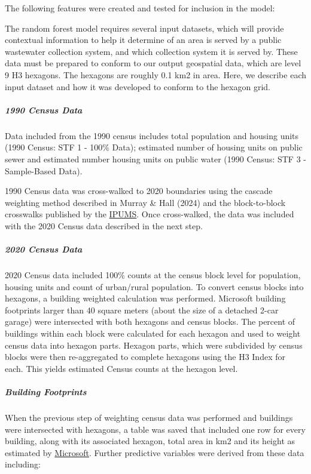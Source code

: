 \documentclass[
  letterpaper,
  DIV=11,
  numbers=noendperiod]{scrartcl}
\let\oldsubparagraph\subparagraph
\renewcommand{\subparagraph}[1]{\oldsubparagraph{#1}\mbox{}}
\begin{document}
The following features were created and tested for inclusion in the
model:

The random forest model requires several input datasets, which will
provide contextual information to help it determine of an area is served
by a public wastewater collection system, and which collection system it
is served by. These data must be prepared to conform to our output
geospatial data, which are level 9 H3 hexagons. The hexagons are roughly
0.1 km2 in area. Here, we describe each input dataset and how it was
developed to conform to the hexagon grid.

\subparagraph{1990 Census Data}\label{census-data}

Data included from the 1990 census includes total population and housing
units (1990 Census: STF 1 - 100\% Data); estimated number of housing
units on public sewer and estimated number housing units on public water
(1990 Census: STF 3 - Sample-Based Data).

1990 Census data was cross-walked to 2020 boundaries using the cascade
weighting method described in Murray \& Hall (2024) and the
block-to-block crosswalks published by the
\href{https://www.nhgis.org/geographic-crosswalks\#from-blocks}{IPUMS}.
Once cross-walked, the data was included with the 2020 Census data
described in the next step.

\subparagraph{2020 Census Data}\label{census-data-1}

2020 Census data included 100\% counts at the census block level for
population, housing units and count of urban/rural population. To
convert census blocks into hexagons, a building weighted calculation was
performed. Microsoft building footprints larger than 40 square meters
(about the size of a detached 2-car garage) were intersected with both
hexagons and census blocks. The percent of buildings within each block
were calculated for each hexagon and used to weight census data into
hexagon parts. Hexagon parts, which were subdivided by census blocks
were then re-aggregated to complete hexagons using the H3 Index for
each. This yields estimated Census counts at the hexagon level.

\subparagraph{Building Footprints}\label{building-footprints}

When the previous step of weighting census data was performed and
buildings were intersected with hexagons, a table was saved that
included one row for every building, along with its associated hexagon,
total area in km2 and its height as estimated by
\href{https://github.com/microsoft/GlobalMLBuildingFootprints}{Microsoft}.
Further predictive variables were derived from these data including:
\end{document}
